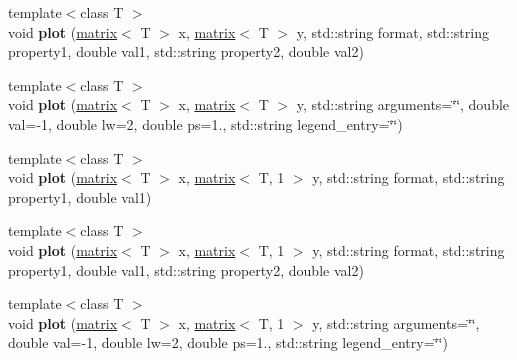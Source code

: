 \begin{DoxyCompactItemize}
\item 
\hypertarget{classkeycpp_1_1_figure_a9000f7c76f21a37d4c70bee3103fe623}{{\footnotesize template$<$class T $>$ }\\void {\bfseries plot} (\hyperlink{classkeycpp_1_1matrix}{matrix}$<$ T $>$ x, \hyperlink{classkeycpp_1_1matrix}{matrix}$<$ T $>$ y, std\-::string format, std\-::string property1, double val1, std\-::string property2, double val2)}\label{classkeycpp_1_1_figure_a9000f7c76f21a37d4c70bee3103fe623}

\item 
\hypertarget{classkeycpp_1_1_figure_a79f823ad4b62e20a85c9f1270e65fb01}{{\footnotesize template$<$class T $>$ }\\void {\bfseries plot} (\hyperlink{classkeycpp_1_1matrix}{matrix}$<$ T $>$ x, \hyperlink{classkeycpp_1_1matrix}{matrix}$<$ T $>$ y, std\-::string arguments=\char`\"{}\char`\"{}, double val=-\/1, double lw=2, double ps=1., std\-::string legend\-\_\-entry=\char`\"{}\char`\"{})}\label{classkeycpp_1_1_figure_a79f823ad4b62e20a85c9f1270e65fb01}

\item 
\hypertarget{classkeycpp_1_1_figure_a0988a3407d023ed5cdae56ffdb22d8fe}{{\footnotesize template$<$class T $>$ }\\void {\bfseries plot} (\hyperlink{classkeycpp_1_1matrix}{matrix}$<$ T $>$ x, \hyperlink{classkeycpp_1_1matrix}{matrix}$<$ T, 1 $>$ y, std\-::string format, std\-::string property1, double val1)}\label{classkeycpp_1_1_figure_a0988a3407d023ed5cdae56ffdb22d8fe}

\item 
\hypertarget{classkeycpp_1_1_figure_aa1e56a0aff841b0ba7d3c3a56768e05b}{{\footnotesize template$<$class T $>$ }\\void {\bfseries plot} (\hyperlink{classkeycpp_1_1matrix}{matrix}$<$ T $>$ x, \hyperlink{classkeycpp_1_1matrix}{matrix}$<$ T, 1 $>$ y, std\-::string format, std\-::string property1, double val1, std\-::string property2, double val2)}\label{classkeycpp_1_1_figure_aa1e56a0aff841b0ba7d3c3a56768e05b}

\item 
\hypertarget{classkeycpp_1_1_figure_a1e96644138f10db60f0f0be9272d5004}{{\footnotesize template$<$class T $>$ }\\void {\bfseries plot} (\hyperlink{classkeycpp_1_1matrix}{matrix}$<$ T $>$ x, \hyperlink{classkeycpp_1_1matrix}{matrix}$<$ T, 1 $>$ y, std\-::string arguments=\char`\"{}\char`\"{}, double val=-\/1, double lw=2, double ps=1., std\-::string legend\-\_\-entry=\char`\"{}\char`\"{})}\label{classkeycpp_1_1_figure_a1e96644138f10db60f0f0be9272d5004}


\end{DoxyCompactItemize}
